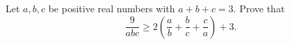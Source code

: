 Let $a,b,c$ be positive real numbers with $a+b+c=3$. Prove that
\[
\dfrac{9}{abc}\ge2\left(\dfrac {a}{b}+\dfrac {b}{c}+\dfrac {c}{a}\right)+3 .
\]
